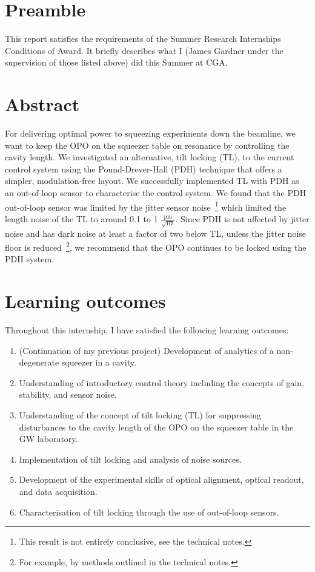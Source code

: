 \documentclass[aps,pra,superscriptaddress,reprint,nofootinbib]{revtex4-1}
\begin{document}
\section{Preamble}

This report satisfies the requirements of the Summer Research Internships Conditions of Award. It briefly describes what I (James Gardner under the supervision of those listed above) did this Summer at CGA.

\section{Abstract}

For delivering optimal power to squeezing experiments down the beamline, we want to keep the OPO on the squeezer table on resonance by controlling the cavity length. We investigated an alternative, tilt locking (TL), to the current control system using the Pound-Drever-Hall (PDH) technique that offers a simpler, modulation-free layout. We successfully implemented TL with PDH as an out-of-loop sensor to characterise the control system. We found that the PDH out-of-loop sensor was limited by the jitter sensor noise~\footnote{This result is not entirely conclusive, see the technical notes.} which limited the length noise of the TL to around 0.1 to 1 $\frac{\mathrm{pm}}{\sqrt{\mathrm{Hz}}}$. Since PDH is not affected by jitter noise and has dark noise at least a factor of two below TL, unless the jitter noise floor is reduced~\footnote{For example, by methods outlined in the technical notes.}, we recommend that the OPO continues to be locked using the PDH system.


\section{Learning outcomes}

Throughout this internship, I have satisfied the following learning outcomes:
\begin{enumerate}
\item (Continuation of my previous project) Development of analytics of a non-degenerate squeezer in a cavity.
\item Understanding of introductory control theory including the concepts of gain, stability, and sensor noise.
\item Understanding of the concept of tilt locking (TL) for suppressing disturbances to the cavity length of the OPO on the squeezer table in the GW laboratory.
\item Implementation of tilt locking and analysis of noise sources.
\item Development of the experimental skills of optical alignment, optical readout, and data acquisition.
\item Characterisation of tilt locking through the use of out-of-loop sensors.
\end{enumerate}
\end{document}
